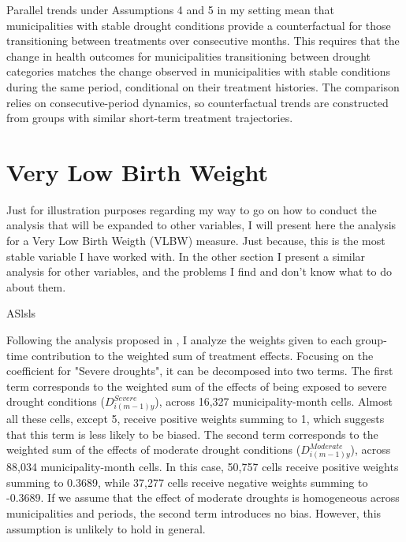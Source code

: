 \documentclass[12pt, oneside]{article}      %
\begin{document}
Parallel trends under Assumptions 4 and 5 in my setting mean that municipalities with stable drought conditions provide a counterfactual for those transitioning between treatments over consecutive months. This requires that the change in health outcomes for municipalities transitioning between drought categories matches the change observed in municipalities with stable conditions during the same period, conditional on their treatment histories. The comparison relies on consecutive-period dynamics, so counterfactual trends are constructed from groups with similar short-term treatment trajectories.


\section{Very Low Birth Weight}

Just for illustration purposes regarding my way to go on how to conduct the analysis that will be expanded to other variables, I will present here the analysis for a Very Low Birth Weigth (VLBW) measure. Just because, this is the most stable variable I have worked with. In the other section I present a similar analysis for other variables, and the problems I find and don't know what to do about them.


ASlsls




Following the analysis proposed in \cite{deChaisemartin2023}, I analyze the weights given to each group-time contribution to the weighted sum of treatment effects. Focusing on the coefficient for "Severe droughts", it can be decomposed into two terms. The first term corresponds to the weighted sum of the effects of being exposed to severe drought conditions ($D^{Severe}_{i(m-1)y}$), across 16,327 municipality-month cells. Almost all these cells, except 5, receive positive weights summing to 1, which suggests that this term is less likely to be biased. The second term corresponds to the weighted sum of the effects of moderate drought conditions ($D^{Moderate}_{i(m-1)y}$), across 88,034 municipality-month cells. In this case, 50,757 cells receive positive weights summing to 0.3689, while 37,277 cells receive negative weights summing to -0.3689. If we assume that the effect of moderate droughts is homogeneous across municipalities and periods, the second term introduces no bias. However, this assumption is unlikely to hold in general. 
\end{document}
